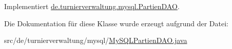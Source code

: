 Implementiert \hyperlink{interfacede_1_1turnierverwaltung_1_1mysql_1_1_partien_d_a_o_a0cf9b8ac8173ef8e45b90e89a090d5ed}{de.\+turnierverwaltung.\+mysql.\+Partien\+D\+AO}.



Die Dokumentation für diese Klasse wurde erzeugt aufgrund der Datei\+:\begin{DoxyCompactItemize}
\item 
src/de/turnierverwaltung/mysql/\hyperlink{_my_s_q_l_partien_d_a_o_8java}{My\+S\+Q\+L\+Partien\+D\+A\+O.\+java}\end{DoxyCompactItemize}
